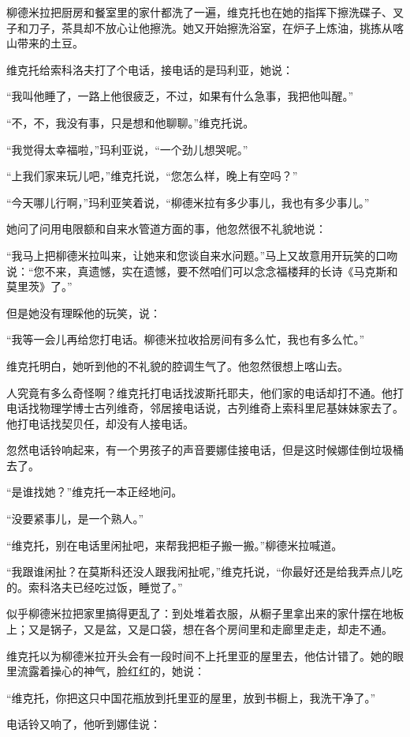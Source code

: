 柳德米拉把厨房和餐室里的家什都洗了一遍，维克托也在她的指挥下擦洗碟子、叉子和刀子，茶具却不放心让他擦洗。她又开始擦洗浴室，在炉子上炼油，挑拣从喀山带来的土豆。

维克托给索科洛夫打了个电话，接电话的是玛利亚，她说：

“我叫他睡了，一路上他很疲乏，不过，如果有什么急事，我把他叫醒。”

“不，不，我没有事，只是想和他聊聊。”维克托说。

“我觉得太幸福啦，”玛利亚说，“一个劲儿想哭呢。”

“上我们家来玩儿吧，”维克托说，“您怎么样，晚上有空吗？”

“今天哪儿行啊，”玛利亚笑着说，“柳德米拉有多少事儿，我也有多少事儿。”

她问了问用电限额和自来水管道方面的事，他忽然很不礼貌地说：

“我马上把柳德米拉叫来，让她来和您谈自来水问题。”马上又故意用开玩笑的口吻说：“您不来，真遗憾，实在遗憾，要不然咱们可以念念福楼拜的长诗《马克斯和莫里茨》了。”

但是她没有理睬他的玩笑，说：

“我等一会儿再给您打电话。柳德米拉收拾房间有多么忙，我也有多么忙。”

维克托明白，她听到他的不礼貌的腔调生气了。他忽然很想上喀山去。

人究竟有多么奇怪啊？维克托打电话找波斯托耶夫，他们家的电话却打不通。他打电话找物理学博士古列维奇，邻居接电话说，古列维奇上索科里尼基妹妹家去了。他打电话找契贝任，却没有人接电话。

忽然电话铃响起来，有一个男孩子的声音要娜佳接电话，但是这时候娜佳倒垃圾桶去了。

“是谁找她？”维克托一本正经地问。

“没要紧事儿，是一个熟人。”

“维克托，别在电话里闲扯吧，来帮我把柜子搬一搬。”柳德米拉喊道。

“我跟谁闲扯？在莫斯科还没人跟我闲扯呢，”维克托说，“你最好还是给我弄点儿吃的。索科洛夫已经吃过饭，睡觉了。”

似乎柳德米拉把家里搞得更乱了：到处堆着衣服，从橱子里拿出来的家什摆在地板上；又是锅子，又是盆，又是口袋，想在各个房间里和走廊里走走，却走不通。

维克托以为柳德米拉开头会有一段时间不上托里亚的屋里去，他估计错了。她的眼里流露着操心的神气，脸红红的，她说：

“维克托，你把这只中国花瓶放到托里亚的屋里，放到书橱上，我洗干净了。”

电话铃又响了，他听到娜佳说：

